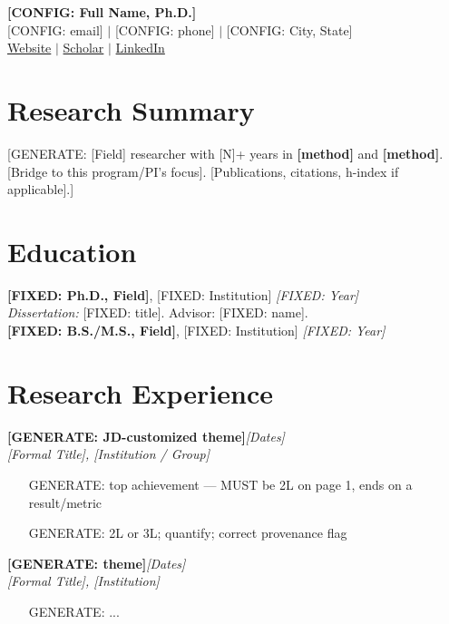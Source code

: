 \documentclass[11pt,letterpaper]{article}
\newcommand{\daterange}[1]{\hfill\textnormal{\textit{#1}}}
\newcommand{\role}[4]{\textbf{#1}\daterange{#4}\\ \textit{#2, #3}\par\vspace{1pt}}
\begin{document}
\begin{center}
  {\LARGE\bfseries [CONFIG: Full Name, Ph.D.]}\\[2pt]
  [CONFIG: email] $\vert$ [CONFIG: phone] $\vert$ [CONFIG: City, State]\\
  \href{[CONFIG: website URL]}{Website} $\vert$ \href{[CONFIG: Google Scholar/ORCID]}{Scholar} $\vert$ \href{[CONFIG: LinkedIn URL]}{LinkedIn}
\end{center}

\section{Research Summary}
[GENERATE: [Field] researcher with [N]+ years in \textbf{[method]} and \textbf{[method]}. [Bridge to this program/PI's focus]. [Publications, citations, h-index if applicable].]

\section{Education}
\textbf{[FIXED: Ph.D., Field]}, [FIXED: Institution] \daterange{[FIXED: Year]}\\
\textit{Dissertation:} [FIXED: title]. Advisor: [FIXED: name].\\[3pt]
\textbf{[FIXED: B.S./M.S., Field]}, [FIXED: Institution] \daterange{[FIXED: Year]}

\section{Research Experience}
\role{[GENERATE: JD-customized theme]}{[Formal Title]}{[Institution / Group]}{[Dates]}
\begin{itemize}
  \item [GENERATE: top achievement — MUST be 2L on page 1, ends on a result/metric]
  \item [GENERATE: 2L or 3L; quantify; correct provenance flag]
\end{itemize}

\role{[GENERATE: theme]}{[Formal Title]}{[Institution]}{[Dates]}
\begin{itemize}
  \item [GENERATE: ...]
\end{itemize}
\end{document}
